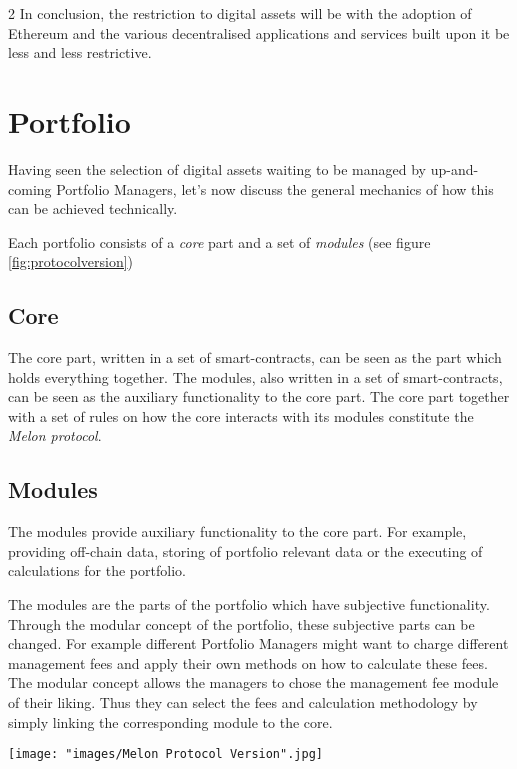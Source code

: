 \documentclass[9pt,oneside]{amsart}
\theoremstyle{plain}
\begin{document}
\begin{multicols}{2}
    In conclusion, the restriction to digital assets will be with the adoption of Ethereum and the various decentralised applications and services built upon it be less and less restrictive.
    
    \section{Portfolio}\label{sec:portfolio}
    
    Having seen the selection of digital assets waiting to be managed by up-and-coming Portfolio Managers, let's now discuss the general mechanics of how this can be achieved technically.
    
    Each portfolio consists of a \textit{core} part and a set of \textit{modules} (see figure \ref{fig:protocolversion})
    
    \subsection{Core}\label{sub:core}
    
    The core part, written in a set of smart-contracts, can be seen as the part which holds everything together. The modules, also written in a set of smart-contracts, can be seen as the auxiliary functionality to the core part. The core part together with a set of rules on how the core interacts with its modules constitute the \textit{Melon protocol}.
    
    \subsection{Modules}\label{sub:modules}
    
    The modules provide auxiliary functionality to the core part. For example, providing off-chain data, storing of portfolio relevant data or the executing of calculations for the portfolio.
    
    The modules are the parts of the portfolio which have subjective functionality. Through the modular concept of the portfolio, these subjective parts can be changed. For example different Portfolio Managers might want to charge different management fees and apply their own methods on how to calculate these fees. The modular concept allows the managers to chose the management fee module of their liking. Thus they can select the fees and calculation methodology by simply linking the corresponding module to the core.
    
    \begin{figure*}[ht!]
        \centering
        \texttt{[image: "images/Melon Protocol Version".jpg]}
        \caption{Protocol version links existing portfolios and collects licensing fees \label{fig:protocolversion}}
    \end{figure*}
    

\end{multicols}
\end{document}
